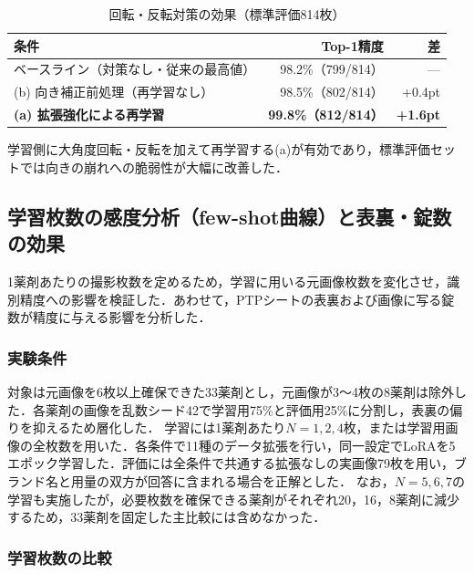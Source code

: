 \documentclass[dvipdfmx]{jsarticle}
\begin{document}
\begin{table}[htbp]
\centering
\caption{回転・反転対策の効果（標準評価814枚）}
\label{tab:rotation}
\begin{tabular}{lrr}
\hline
条件 & Top-1精度 & 差 \\
\hline
ベースライン（対策なし・従来の最高値） & 98.2\%（799/814） & --- \\
(b) 向き補正前処理（再学習なし） & 98.5\%（802/814） & +0.4pt \\
\textbf{(a) 拡張強化による再学習} & \textbf{99.8\%（812/814）} & \textbf{+1.6pt} \\
\hline
\end{tabular}
\end{table}

学習側に大角度回転・反転を加えて再学習する(a)が有効であり，標準評価セットでは向きの崩れへの脆弱性が大幅に改善した．

\subsection{学習枚数の感度分析（few-shot曲線）と表裏・錠数の効果}\label{sec:fewshot}

1薬剤あたりの撮影枚数を定めるため，学習に用いる元画像枚数を変化させ，識別精度への影響を検証した．あわせて，PTPシートの表裏および画像に写る錠数が精度に与える影響を分析した．

\subsubsection{実験条件}

対象は元画像を6枚以上確保できた33薬剤とし，元画像が3〜4枚の8薬剤は除外した．各薬剤の画像を乱数シード42で学習用75\%と評価用25\%に分割し，表裏の偏りを抑えるため層化した．
学習には1薬剤あたり$N=1,2,4$枚，または学習用画像の全枚数を用いた．各条件で11種のデータ拡張を行い，同一設定でLoRAを5エポック学習した．評価には全条件で共通する拡張なしの実画像79枚を用い，ブランド名と用量の双方が回答に含まれる場合を正解とした．
なお，$N=5,6,7$の学習も実施したが，必要枚数を確保できる薬剤がそれぞれ20，16，8薬剤に減少するため，33薬剤を固定した主比較には含めなかった．

\subsubsection{学習枚数の比較}
\end{document}
